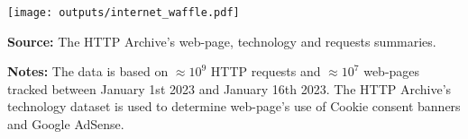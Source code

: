 \documentclass[border=0mm]{article}
\begin{document}
\begin{minipage}{0.05\textwidth}
    \hspace{\fill}
\end{minipage}
\begin{minipage}{0.45\textwidth}
    \vspace*{.2cm}

    \begin{rightframe}[width=1.03\textwidth,arc=10pt,auto outer arc]
    {\texttt{[image: outputs/internet\_waffle.pdf]}
    \newline
    \vspace*{-.2cm}

    {\small\linespread{.2}\selectfont\fontsize{8pt}{.2cm}\selectfont
        \textbf{Source:} The HTTP Archive's web-page, technology and requests summaries.

        \textbf{Notes:} The data is based on $\approx 10^9$ HTTP requests and $\approx 10^7$
        web-pages tracked between January 1st 2023 and January 16th 2023.
        The HTTP Archive's technology dataset is used to determine web-page's use of
        Cookie consent banners and Google AdSense.  \par} }
    \end{rightframe}
\end{minipage}
\end{document}
